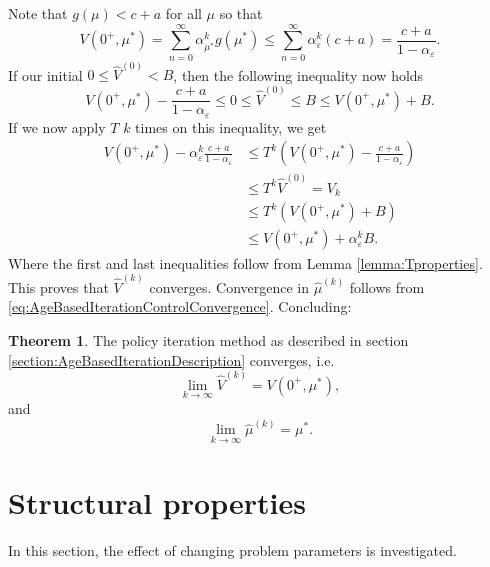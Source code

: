 \documentclass[a4paper]{thesis}
\theoremstyle{definition}
\newtheorem{theorem}{Theorem}[chapter]
\begin{document}
Note that $g(\mu)<c+a$ for all $\mu$ so that 
$$
V(0^+,\mu^*)=\sum\limits_{n=0}^\infty \alpha_{\mu^*}^kg(\mu^*)\leq \sum\limits_{n=0}^\infty \alpha_\varepsilon^k(c+a)=\frac{c+a}{1-\alpha_\varepsilon}.
$$
If our initial $0\leq \hat{V}^{(0)}<B$, then the following inequality now holds
$$
V(0^+,\mu^*)-\frac{c+a}{1-\alpha_\varepsilon}\leq 0\leq \hat{V}^{(0)}\leq B\leq V(0^+,\mu^*)+B.
$$
If we now apply $T$ $k$ times on this inequality, we get
\[\begin{split}
V(0^+,\mu^*)-\alpha_\varepsilon^k\frac{c+a}{1-\alpha_\varepsilon} &\leq T^k(V(0^+,\mu^*)-\frac{c+a}{1-\alpha_\varepsilon})\\
&\leq  T^k\hat{V}^{(0)}=V_k\\
&\leq T^k(V(0^+,\mu^*)+B) \\
&\leq V(0^+,\mu^*)+\alpha_\varepsilon^kB.
\end{split}\]
Where the first and last inequalities follow from Lemma \ref{lemma:Tproperties}.
This proves that $\hat{V}^{(k)}$ converges.
Convergence in $\hat\mu^{(k)}$ follows from \eqref{eq:AgeBasedIterationControlConvergence}.
Concluding:
\begin{theorem}
	The policy iteration method as described in section \ref*{section:AgeBasedIterationDescription} converges, i.e.
	\[\lim\limits_{k\rightarrow\infty}\hat{V}^{(k)}=V(0^+,\mu^*),\]
	and
	\[\lim\limits_{k\rightarrow\infty}\hat{\mu}^{(k)}=\mu^*.\]
\end{theorem} \section{Structural properties}\label{section:AgeBasedStructuralProperties}
In this section, the effect of changing problem parameters is investigated.
\end{document}
